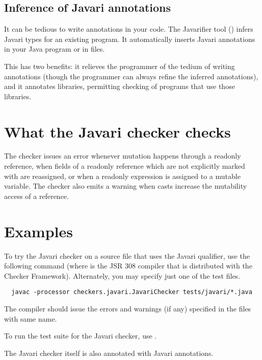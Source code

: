 \subsection{Inference of Javari annotations\label{javari-inference}}

It can be tedious to write annotations in your code.  The Javarifier tool
() infers 
Javari types for an existing program.  It 
automatically inserts Javari annotations in your Java program or
in  files.

This has two benefits:  it relieves the programmer of the tedium of writing
annotations (though the programmer can always refine the inferred
annotations), and it annotates libraries, permitting checking of programs
that use those libraries.



\section{What the Javari checker checks\label{javari-checks}}

The checker issues an error whenever mutation happens through a readonly
reference, when fields of a readonly reference which are not explicitly
marked with  are reassigned, or
when a readonly expression is assigned to a mutable variable.  The checker
also emits a warning when casts increase the mutability access of a
reference.



\section{Examples\label{javari-examples}}

To try the Javari checker on a source file that uses the Javari
qualifier, use the following command (where  is the JSR 308
compiler  that
is distributed with the Checker Framework).  Alternately, you may
specify just one of the test files.

\begin{Verbatim}
  javac -processor checkers.javari.JavariChecker tests/javari/*.java
\end{Verbatim}

\noindent
The compiler should issue the errors and warnings (if any) specified in the
 files with same name.

To run the test suite for the Javari checker, use .

The Javari checker itself is also annotated with Javari annotations.


